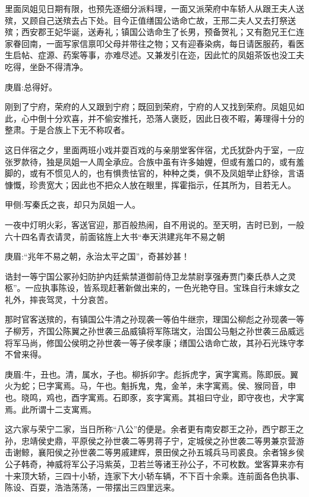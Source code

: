 \begin{parag}
    里面凤姐见日期有限，也预先逐细分派料理，一面又派荣府中车轿人从跟王夫人送殡，又顾自己送殡去占下处。目今正值缮国公诰命亡故，王邢二夫人又去打祭送殡；西安郡王妃华诞，送寿礼；镇国公诰命生了长男，预备贺礼；又有胞兄王仁连家眷回南，一面写家信禀叩父母并带往之物；又有迎春染病，每日请医服药，看医生启帖、症源、药案等事，亦难尽述。又兼发引在迩，因此忙的凤姐茶饭也没工夫吃得，坐卧不得清净。\begin{note}庚眉:总得好。\end{note}刚到了宁府，荣府的人又跟到宁府；既回到荣府，宁府的人又找到荣府。凤姐见如此，心中倒十分欢喜，并不偷安推托，恐落人褒贬，因此日夜不暇，筹理得十分的整肃。于是合族上下无不称叹者。
\end{parag}


\begin{parag}
    这日伴宿之夕，里面两班小戏并耍百戏的与亲朋堂客伴宿，尤氏犹卧内于室，一应张罗款待，独是凤姐一人周全承应。合族中虽有许多妯娌，但或有羞口的，或有羞脚的，或有不惯见人的，也有惧贵怯官的，种种之类，俱不及凤姐举止舒徐，言语慷慨，珍贵宽大；因此也不把众人放在眼里，挥霍指示，任其所为，目若无人。\begin{note}甲侧:写秦氏之丧，却只为凤姐一人。\end{note}一夜中灯明火彩，客送官迎，那百般热闹，自不用说的。至天明，吉时已到，一般六十四名青衣请灵，前面铭旌上大书“奉天洪建兆年不易之朝\begin{note}庚眉:“兆年不易之朝，永治太平之国”，奇甚妙甚！\end{note}诰封一等宁国公冢孙妇防护内廷紫禁道御前侍卫龙禁尉享强寿贾门秦氏恭人之灵柩”。一应执事陈设，皆系现赶著新做出来的，一色光艳夺目。宝珠自行未嫁女之礼外，摔丧驾灵，十分哀苦。
\end{parag}


\begin{parag}
    那时官客送殡的，有镇国公牛清之孙现袭一等伯牛继宗，理国公柳彪之孙现袭一等子柳芳，齐国公陈翼之孙世袭三品威镇将军陈瑞文，治国公马魁之孙世袭三品威远将军马尚，修国公侯明之孙世袭一等子侯孝康；缮国公诰命亡故，其孙石光珠守孝不曾来得。\begin{note}庚眉:牛，丑也。清，属水，子也。柳拆卯字。彪拆虎字，寅字寓焉。陈即辰。翼火为蛇；巳字寓焉。马，午也。魁拆鬼，鬼，金羊，未字寓焉。侯、猴同音，申也。晓鸣，鸡也，酉字寓焉。石即豕，亥字寓焉。其祖曰守业，即守夜也，犬字寓焉。此所谓十二支寓焉。\end{note}这六家与荣宁二家，当日所称“八公”的便是。余者更有南安郡王之孙，西宁郡王之孙，忠靖侯史鼎，平原侯之孙世袭二等男蒋子宁，定城侯之孙世袭二等男兼京营游击谢鲸，襄阳侯之孙世袭二等男戚建辉，景田侯之孙五城兵马司裘良。余者锦乡侯公子韩奇，神威将军公子冯紫英，卫若兰等诸王孙公子，不可枚数。堂客算来亦有十来顶大轿，三四十小轿，连家下大小轿车辆，不下百十余乘。连前面各色执事、陈设、百耍，浩浩荡荡，一带摆出三四里远来。
\end{parag}


